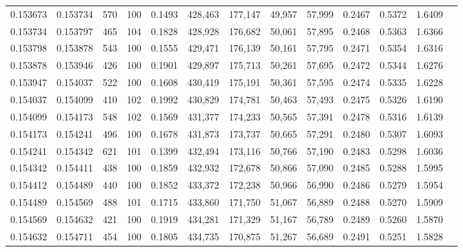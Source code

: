 \begin{tabular}{rrrrrrrrrrrrr}
0.153673 & 0.153734 &   570 & 100 &                                     0.1493 & 428,463 & 177,147 &  49,957 &  57,999 & 0.2467 & 0.5372 & 1.6409 \\
0.153734 & 0.153797 &   465 & 104 &                                     0.1828 & 428,928 & 176,682 &  50,061 &  57,895 & 0.2468 & 0.5363 & 1.6366 \\
0.153798 & 0.153878 &   543 & 100 &                                     0.1555 & 429,471 & 176,139 &  50,161 &  57,795 & 0.2471 & 0.5354 & 1.6316 \\
0.153878 & 0.153946 &   426 & 100 &                                     0.1901 & 429,897 & 175,713 &  50,261 &  57,695 & 0.2472 & 0.5344 & 1.6276 \\
0.153947 & 0.154037 &   522 & 100 &                                     0.1608 & 430,419 & 175,191 &  50,361 &  57,595 & 0.2474 & 0.5335 & 1.6228 \\
0.154037 & 0.154099 &   410 & 102 &                                     0.1992 & 430,829 & 174,781 &  50,463 &  57,493 & 0.2475 & 0.5326 & 1.6190 \\
0.154099 & 0.154173 &   548 & 102 &                                     0.1569 & 431,377 & 174,233 &  50,565 &  57,391 & 0.2478 & 0.5316 & 1.6139 \\
0.154173 & 0.154241 &   496 & 100 &                                     0.1678 & 431,873 & 173,737 &  50,665 &  57,291 & 0.2480 & 0.5307 & 1.6093 \\
0.154241 & 0.154342 &   621 & 101 &                                     0.1399 & 432,494 & 173,116 &  50,766 &  57,190 & 0.2483 & 0.5298 & 1.6036 \\
0.154342 & 0.154411 &   438 & 100 &                                     0.1859 & 432,932 & 172,678 &  50,866 &  57,090 & 0.2485 & 0.5288 & 1.5995 \\
0.154412 & 0.154489 &   440 & 100 &                                     0.1852 & 433,372 & 172,238 &  50,966 &  56,990 & 0.2486 & 0.5279 & 1.5954 \\
0.154489 & 0.154569 &   488 & 101 &                                     0.1715 & 433,860 & 171,750 &  51,067 &  56,889 & 0.2488 & 0.5270 & 1.5909 \\
0.154569 & 0.154632 &   421 & 100 &                                     0.1919 & 434,281 & 171,329 &  51,167 &  56,789 & 0.2489 & 0.5260 & 1.5870 \\
0.154632 & 0.154711 &   454 & 100 &                                     0.1805 & 434,735 & 170,875 &  51,267 &  56,689 & 0.2491 & 0.5251 & 1.5828 \\

\end{tabular}
